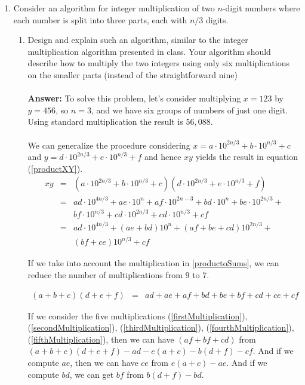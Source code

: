 \documentclass[tikz, 12pt]{scrartcl}
\begin{document}
\begin{enumerate}
\begin{enumerate}
	
	\end{enumerate}
	\item Consider an algorithm for integer multiplication of two $n$-digit numbers where each number is split into three parts, each with $n/3$ digits. 
	
		\begin{enumerate}
			\item Design and explain such an algorithm, similar to the integer multiplication algorithm presented in class. Your algorithm should describe how to multiply the two integers using only six multiplications on the smaller parts (instead of the straightforward nine)\\
			\\
			\textbf{Answer: } To solve this problem, let's consider multiplying $x = 123$ by $y = 456$, so $n = 3$, and we have six groups of numbers of just one digit. Using standard multiplication the result is $56, 088$. \\
			\\
			We can generalize the procedure considering $x = a \cdot 10^{2n/3} + b \cdot 10^{n/3} + c$ and $y = d \cdot 10^{2n/3} + e \cdot 10^{n/3} + f$ and hence $xy$ yields the result in equation (\ref{productXY}).
			\begin{eqnarray}
			xy 	&	=	&	(a \cdot 10^{2n/3} + b \cdot 10^{n/3} + c)(d \cdot 10^{2n/3} + e \cdot 10^{n/3} + f) \nonumber \\
				&	=	&	 ad \cdot 10^{4n/3} + ae \cdot 10^{n} + af \cdot 10^{2n-3} + bd \cdot 10^n + be \cdot 10^{2n/3} +  \nonumber \\
				&		&	bf \cdot 10^{n/3} + cd \cdot 10^{2n/3} + cd \cdot 10^{n/3} + cf \nonumber \\
				&	=	&	ad \cdot 10^{4n/3} + (ae + bd)10^n + (af + be + cd)10^{2n/3} + \nonumber \\
				&		&	(bf + ce)10^{n/3} + cf \label{productXY}
			\end{eqnarray}
			
			If we take into account the multiplication in \ref{productoSums}, we can reduce the number of multiplications from 9 to 7.
			
			\begin{eqnarray}
			(a + b + c)(d + e + f) 	&	=	&	ad + ae + af + bd + be + bf + cd + ce + cf \label{productoSums}
			\end{eqnarray}
			
			If we consider  the five multiplications (\ref{firstMultiplication}), (\ref{secondMultiplication}), (\ref{thirdMultiplication}), (\ref{fourthMultiplication}), (\ref{fifthMultiplication}), then we can have $(af + bf + cd)$ from $(a + b +c)(d + e + f) - ad - e(a + c) - b(d + f) - cf$. And if we compute $ae$, then we can have $ce$ from $e(a + c) - ae$. And if we compute $bd$, we can get $bf$ from $b(d + f) - bd$.
			

\end{enumerate}
\end{enumerate}
\end{document}
